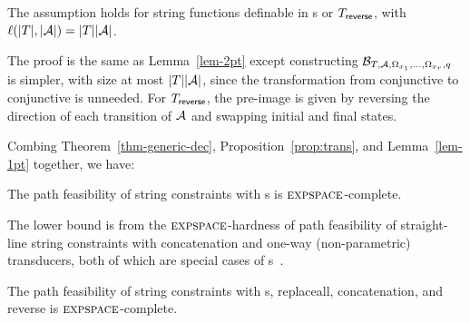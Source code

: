 \begin{lemma}\label{lem-1pt}
	The \prerec{} assumption holds for string functions definable in \PT{}s or $T_{\sf reverse}$, with $\ell(|T|, |\mathcal{A}|) = |T||\mathcal{A}|$.
\end{lemma}

The proof is the same as Lemma~\ref{lem-2pt} except constructing $\mathcal{B}_{T, \mathcal{A}, \Omega_{x_1}, \ldots, \Omega_{x_r}, q}$ is simpler, with size at most $|T| |\mathcal{A}|$, since the transformation from  conjunctive \FFA{} to conjunctive \FA{} is unneeded. For $T_{\sf reverse}$, the pre-image is given by reversing the direction of each transition of $\mathcal{A}$ and swapping initial and final states.   

Combing Theorem~\ref{thm-generic-dec}, Proposition~\ref{prop:trans}, and Lemma~\ref{lem-1pt} together, we have:

\begin{theorem} \label{thm-s2pt}
The path feasibility of string constraints with \SPPT{}s is $\textsc{expspace}$-complete. 
\end{theorem}

The lower bound is from the $\textsc{expspace}$-hardness of path feasibility of straight-line string constraints with concatenation and one-way (non-parametric) transducers,  both of which are special cases of \PT{}s~\cite{LB16}.

\begin{corollary}\label{cor-s2pt}
The path feasibility of string constraints with \FT{}s, replaceall, concatenation, and reverse is $\textsc{expspace}$-complete.
\end{corollary}
